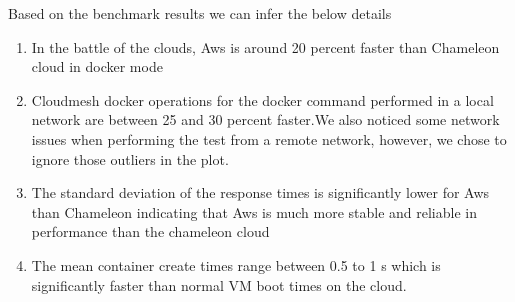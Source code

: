 \documentclass[9pt,twocolumn,twoside]{../../styles/osajnl}
\begin{document}
Based on the benchmark results we can infer the below details
\begin{enumerate}
\item  In the battle of the clouds, Aws is around 20 percent faster than Chameleon cloud in docker mode
\item  Cloudmesh docker operations for the docker command performed in a local network are between
25 and 30  percent faster.We also noticed some network issues when performing the test from a
remote network, however, we chose to ignore those outliers in the plot.
\item The standard deviation of the response times is significantly lower for Aws than Chameleon indicating 
that Aws is much more stable and reliable in performance than the chameleon cloud
\item The mean container create times range between 0.5 to 1 s which is significantly faster than normal VM 
boot times on the cloud.
\end{enumerate}
\end{document}
